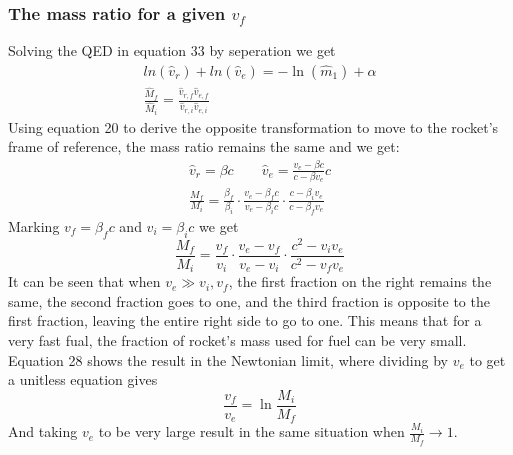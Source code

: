 \documentclass{article}
\begin{document}
\subsubsection{The mass ratio for a given $v_f$}
Solving the QED in equation 33 by seperation we get
\begin{equation}
\begin{gathered}
    ln(\hat{v}_r) + ln(\hat{v}_e) = -\ln(\hat{m}_1) + \alpha \\
    \frac{\hat{M}_f}{\hat{M}_i} = \frac{\hat{v}_{r,f}\hat{v}_{e,f}}{\hat{v}_{r,i}\hat{v}_{e,i}}
\end{gathered}
\end{equation}
Using equation 20 to derive the opposite transformation to move to the rocket's frame of reference, the mass ratio remains the same and we get:
\begin{equation}
\begin{gathered}
    \hat{v}_r = \beta c \qquad \hat{v}_e = \frac{v_e - \beta c}{c - \beta v_e}c \\
    \frac{M_f}{M_i} =
    \frac{\beta_f}{\beta_i}\cdot
    \frac{v_e - \beta_f c}{v_e - \beta_i c}\cdot
    \frac{c - \beta_i v_e}{c - \beta_f v_e}
\end{gathered}
\end{equation}
Marking $v_f = \beta_f c$ and $v_i = \beta_i c$ we get
\begin{equation}
    \frac{M_f}{M_i} =
    \frac{v_f}{v_i}\cdot
    \frac{v_e - v_f}{v_e - v_i}\cdot
    \frac{c^2 - v_i v_e}{c^2 - v_f v_e}
\end{equation}
It can be seen that when $v_e \gg v_i, v_f$, the first fraction on the right remains the same, the second fraction goes to one, and the third fraction is opposite to the first fraction, leaving the entire right side to go to one. This means that for a very fast fual, the fraction of rocket's mass used for fuel can be very small.
\newline
Equation 28 shows the result in the Newtonian limit, where dividing by $v_e$ to get a unitless equation gives
\begin{equation}
    \frac{v_f}{v_e} = \ln\frac{M_i}{M_f}
\end{equation}
And taking $v_e$ to be very large result in the same situation when $\frac{M_i}{M_f} \rightarrow 1$.
\end{document}
